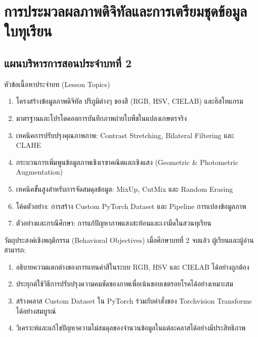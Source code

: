 \chapter{การประมวลผลภาพดิจิทัลและการเตรียมชุดข้อมูลใบทุเรียน}
\label{chap:image_processing}

\section*{แผนบริหารการสอนประจำบทที่ 2}

\begin{planbox}{หัวข้อเนื้อหาประจำบท (Lesson Topics)}
\begin{enumerate}[leftmargin=1.5em, itemsep=2pt]
    \item โครงสร้างข้อมูลภาพดิจิทัล ปริภูมิต่างๆ ของสี (RGB, HSV, CIELAB) และฮิสโทแกรม
    \item มาตรฐานและโปรโตคอลการบันทึกภาพถ่ายใบพืชในแปลงเกษตรจริง
    \item เทคนิคการปรับปรุงคุณภาพภาพ: Contrast Stretching, Bilateral Filtering และ CLAHE
    \item กระบวนการเพิ่มพูนข้อมูลภาพเชิงเรขาคณิตและเชิงแสง (Geometric \& Photometric Augmentation)
    \item เทคนิคขั้นสูงสำหรับการจัดสมดุลข้อมูล: MixUp, CutMix และ Random Erasing
    \item โค้ดตัวอย่าง: การสร้าง Custom PyTorch Dataset และ Pipeline การแปลงข้อมูลภาพ
    \item ตัวอย่างและกรณีศึกษา: การแก้ปัญหาภาพแสงสะท้อนและเงามืดในสวนทุเรียน
\end{enumerate}
\end{planbox}

\begin{planbox}{วัตถุประสงค์เชิงพฤติกรรม (Behavioral Objectives)}
เมื่อศึกษาบทที่ 2 จบแล้ว ผู้เรียนและผู้อ่านสามารถ:
\begin{enumerate}[leftmargin=1.5em, itemsep=2pt]
    \item อธิบายความแตกต่างของการแทนค่าสีในระบบ RGB, HSV และ CIELAB ได้อย่างถูกต้อง
    \item ประยุกต์ใช้วิธีการปรับปรุงความคมชัดของภาพเพื่อเน้นขอบเขตรอยโรคได้อย่างเหมาะสม
    \item สร้างคลาส Custom Dataset ใน PyTorch ร่วมกับคำสั่งของ Torchvision Transforms ได้อย่างสมบูรณ์
    \item วิเคราะห์และแก้ไขปัญหาความไม่สมดุลของจำนวนข้อมูลในแต่ละคลาสได้อย่างมีประสิทธิภาพ
\end{enumerate}
\end{planbox}

